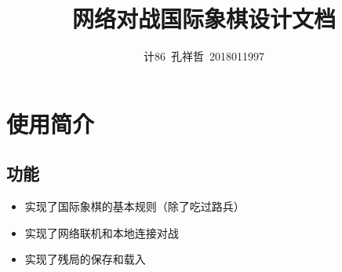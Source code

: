 \documentclass[a4paper,10pt]{article}
\title{网络对战国际象棋设计文档}
\author{计86\ 孔祥哲\ 2018011997}
\date{}
\begin{document}
\maketitle

\section{使用简介}
\subsection{功能}
\begin{itemize}
 \item 实现了国际象棋的基本规则（除了吃过路兵）
 \item 实现了网络联机和本地连接对战
 \item 实现了残局的保存和载入
\end{itemize}
\end{document}
